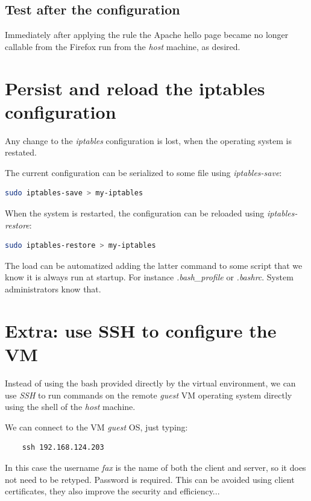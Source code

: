 \documentclass{article}
\begin{document}
\subsection{Test after the configuration}

Immediately after applying the rule the Apache hello page became no longer
callable from the Firefox run from the \emph{host} machine, as desired.

\section{Persist and reload the iptables configuration}

Any change to the \emph{iptables} configuration is lost,
when the operating system is restated.

The current configuration can be serialized to some file using \emph{iptables-save}:
\begin{lstlisting}[language=bash]
 sudo iptables-save > my-iptables
\end{lstlisting}

When the system is restarted, the configuration can be reloaded using \emph{iptables-restore}:
\begin{lstlisting}[language=bash]
 sudo iptables-restore > my-iptables
\end{lstlisting}

The load can be automatized adding the latter command
to some script that we know it is always run at startup.
For instance \emph{.bash\_profile} or \emph{.bashrc}.
System administrators know that.

\section{Extra: use SSH to configure the VM}

Instead of using the bash provided directly by the virtual environment,
we can use \emph{SSH} to run commands on the remote \emph{guest} VM
operating system directly using the shell of the \emph{host} machine.

We can connect to the VM \emph{guest} OS, just typing:
\begin{verbatim}
	ssh 192.168.124.203
\end{verbatim}

In this case the username \emph{fax} is the name of both the client and server,
so it does not need to be retyped.
Password is required.
This can be avoided using client certificates, they also improve the security and efficiency...
	
\end{document}
